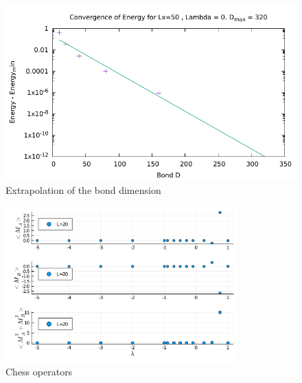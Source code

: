 \documentclass[12pt, a4paper, twoside, titlepage]{article}
\begin{document}
\begin{figure}[htp!]
  \includegraphics{../DMRG_QLM/data/extrapolation_in_bond_D/L_50/plot_extrapolation_in_bond_D_L_50_lam_0.pdf}
  \caption{Extrapolation of the bond dimension}
  \label{}
\end{figure}

\begin{figure}[htp!]
  \centering
  \includegraphics[width=0.8\textwidth]{images/chessop.pdf}
  \caption{Chess operators}
  \label{}
\end{figure}
\end{document}
